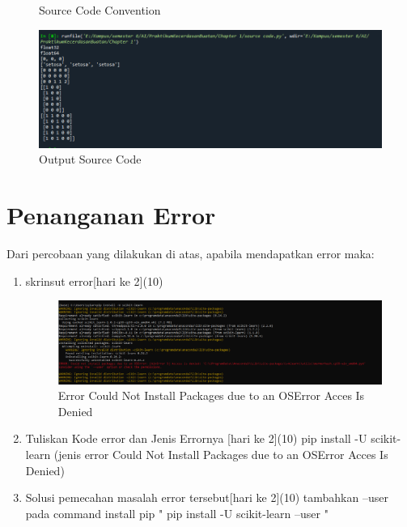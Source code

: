\begin{enumerate}
\begin{figure}[!htbp]
		\caption{Source Code Convention}
		\includegraphics[scale=0.5]{figures/chapter 1/5/2.PNG}
		\caption{Output Source Code}
	\end{figure}
\end{enumerate}

\newpage
\section{Penanganan Error}
Dari percobaan yang dilakukan di atas, apabila mendapatkan error maka:
\begin{enumerate}
	\item
	skrinsut error[hari ke 2](10)
	\begin{figure}[!htbp]
	    \centering
	   	\includegraphics[scale=0.4]{figures/chapter 1/error/1.PNG}
		\caption{Error Could Not Install Packages due to an OSError Acces Is Denied}
	\end{figure}
	\item Tuliskan Kode error dan Jenis Errornya [hari ke 2](10)
	\newline pip install -U scikit-learn (jenis error Could Not Install Packages due to an OSError Acces Is Denied)
	\item Solusi pemecahan masalah error tersebut[hari ke 2](10)
	\newline tambahkan --user pada command install pip " pip install -U scikit-learn --user "
\end{enumerate}
